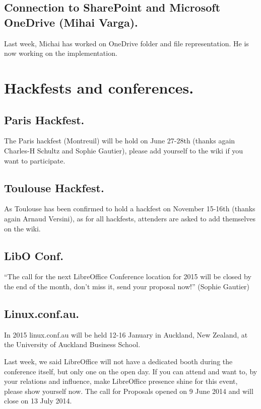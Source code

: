 \documentclass{article}
\begin{document}
\subsection{Connection to SharePoint and Microsoft OneDrive (Mihai Varga).}

Last week, Michai has worked on OneDrive folder and file representation. He is now working on the implementation.\cite{gsocOneDrive}



\section{Hackfests and conferences.}

\subsection{Paris Hackfest.}

The Paris hackfest (Montreuil) will be hold on June 27-28th (thanks
again Charles-H Schultz and Sophie Gautier), please add yourself to the wiki if you want to participate\cite{parisHackfestWiki}.

\subsection{Toulouse Hackfest.}

As Toulouse has been confirmed to hold a hackfest on November 15-16th (thanks again Arnaud Versini), as for all hackfests, attenders are asked to add themselves on the wiki\cite{hackfestToulouseWiki}.

\subsection{LibO Conf.}

``The call for the next LibreOffice Conference location for 2015 will be
closed by the end of the month, don't miss it, send your proposal now!'' (Sophie Gautier) \cite{liboConf2015}

\subsection{Linux.conf.au.}

In 2015 linux.conf.au will be held 12-16 January in Auckland, New Zealand, at
the University of Auckland Business School. 

Last week, we said LibreOffice will not have a dedicated booth during the conference itself, but only one on the open day\cite{linuxConfAuckland2}. If you can attend and want to, by your relations and influence, make LibreOffice presence shine for this event, please show yourself now. The call for Proposals opened on 9 June 2014 and will close on 13 July 2014\cite{linuxConfAuckland1}. 
\end{document}
